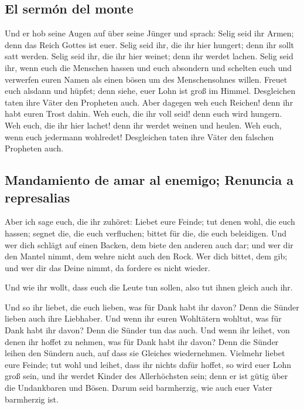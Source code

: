 \hypertarget{el-sermuxf3n-del-monte}{%
\subsection{El sermón del monte}\label{el-sermuxf3n-del-monte}}

 Und er hob seine Augen auf über seine Jünger und sprach:
Selig seid ihr Armen; denn das Reich Gottes ist euer. 
Selig seid ihr, die ihr hier hungert; denn ihr sollt satt werden. Selig
seid ihr, die ihr hier weinet; denn ihr werdet lachen. 
Selig seid ihr, wenn euch die Menschen hassen und euch absondern und
schelten euch und verwerfen euren Namen als einen bösen um des
Menschensohnes willen.  Freuet euch alsdann und hüpfet;
denn siehe, euer Lohn ist groß im Himmel. Desgleichen taten ihre Väter
den Propheten auch.  Aber dagegen weh euch Reichen! denn
ihr habt euren Trost dahin.  Weh euch, die ihr voll seid!
denn euch wird hungern. Weh euch, die ihr hier lachet! denn ihr werdet
weinen und heulen.  Weh euch, wenn euch jedermann
wohlredet! Desgleichen taten ihre Väter den falschen Propheten auch.

\hypertarget{mandamiento-de-amar-al-enemigo-renuncia-a-represalias}{%
\subsection{Mandamiento de amar al enemigo; Renuncia a
represalias}\label{mandamiento-de-amar-al-enemigo-renuncia-a-represalias}}

 Aber ich sage euch, die ihr zuhöret: Liebet eure Feinde;
tut denen wohl, die euch hassen;  segnet die, die euch
verfluchen; bittet für die, die euch beleidigen.  Und wer
dich schlägt auf einen Backen, dem biete den anderen auch dar; und wer
dir den Mantel nimmt, dem wehre nicht auch den Rock.  Wer
dich bittet, dem gib; und wer dir das Deine nimmt, da fordere es nicht
wieder.

 Und wie ihr wollt, dass euch die Leute tun sollen, also
tut ihnen gleich auch ihr.

 Und so ihr liebet, die euch lieben, was für Dank habt
ihr davon? Denn die Sünder lieben auch ihre Liebhaber. 
Und wenn ihr euren Wohltätern wohltut, was für Dank habt ihr davon? Denn
die Sünder tun das auch.  Und wenn ihr leihet, von denen
ihr hoffet zu nehmen, was für Dank habt ihr davon? Denn die Sünder
leihen den Sündern auch, auf dass sie Gleiches wiedernehmen.
 Vielmehr liebet eure Feinde; tut wohl und leihet, dass
ihr nichts dafür hoffet, so wird euer Lohn groß sein, und ihr werdet
Kinder des Allerhöchsten sein; denn er ist gütig über die Undankbaren
und Bösen.  Darum seid barmherzig, wie auch euer Vater
barmherzig ist.

